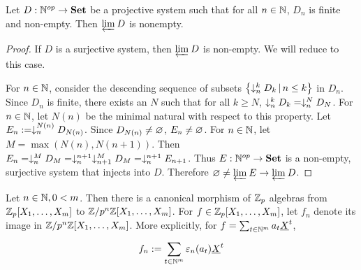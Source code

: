 \begin{prop}
  
  Let $D : \mathbb{N}^{op} \to \mathbf{Set}$ be a projective system 
  such that for all $n\in \mathbb{N}$, $D_n$ is finite and non-empty. 
  Then $\varprojlim_{{}} D $ is nonempty. 
\end{prop}
\begin{proof}
  If $D$ is a surjective system, then $\varprojlim_{{}} D $ is non-empty. 
  We will reduce to this case. 

  For $n \in \mathbb{N}$, 
  consider the descending sequence of subsets 
  $\left\{\downarrow_{n}^{k} D_k \,|\, n \leq k\right\}$ in $D_n$. 
  Since $D_n$ is finite, 
  there exists an $N$ such that for all $k \geq N$, 
  $\downarrow_{n}^{k} D_k = \downarrow_{n}^{N} D_N$.
  For $n \in \mathbb{N}$, 
  let $N(n)$ be the minimal natural with respect to this property. 
  Let $E_n := \downarrow_{n}^{N(n)} D_{N(n)}$.
  Since $D_{N(n)} \neq \varnothing$, $E_n \neq \varnothing$. 
  For $n \in \mathbb{N}$, 
  let $M = \max(N(n),N(n+1))$. 
  Then $E_n = \downarrow_{n}^{M} D_M = \downarrow_{n}^{n+1}\downarrow_{n+1}^{M} D_M 
  = \downarrow_{n}^{n+1} E_{n+1}$. 
  Thus $E : \mathbb{N}^{op} \to \mathbf{Set}$ is a non-empty, surjective system that
  injects into $D$. 
  Therefore $\varnothing \neq \varprojlim_{{}} E \to \varprojlim_{{}} D$.
\end{proof}

\begin{notation}
  Let $n \in \mathbb{N}, 0 < m$. 
  Then there is a canonical morphism of $\mathbb{Z}_p$ algebras from 
  $\mathbb{Z}_p[X_1,\dots,X_m]$ to $\mathbb{Z}/p^n\mathbb{Z}[X_1,\dots,X_m]$.
  For $f \in \mathbb{Z}_p[X_1,\dots,X_m]$,
  let $f_n$ denote its image in $\mathbb{Z}/p^n\mathbb{Z}[X_1,\dots,X_m]$. 
  More explicitly, for $f = \sum_{t \in \mathbb{N}^m}^{} a_t \underline{X}^t$,
  \[
    f_n := \sum_{t \in \mathbb{N}^m}^{} \varepsilon_n(a_t) \underline{X}^t
  \]
\end{notation}

